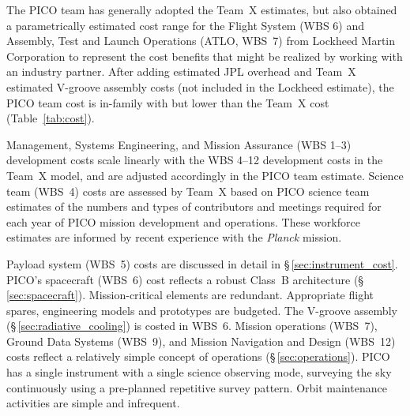 
The PICO team has generally adopted the Team~X estimates, but also
obtained a parametrically estimated cost range for the Flight System
(WBS 6) and Assembly, Test and Launch Operations (ATLO, WBS~7) from
Lockheed Martin Corporation to represent the cost benefits that might
be realized by working with an industry partner. After adding
estimated JPL overhead and Team~X estimated V-groove assembly costs
(not included in the Lockheed estimate), the PICO team cost is
in-family with but lower than the Team~X cost (Table~\ref{tab:cost}).

Management, Systems Engineering, and Mission Assurance (WBS 1--3)
development costs scale linearly with the WBS 4--12 development costs
in the Team~X model, and are adjusted accordingly in the PICO team
estimate. Science team (WBS~4) costs are assessed by Team~X based on PICO
science team estimates of the numbers and types of contributors and
meetings required for each year of PICO mission development and
operations. These workforce estimates are informed by recent
experience with the \textit{Planck} mission.

Payload system (WBS~5) costs are discussed in detail in
\S\,\ref{sec:instrument_cost}.  PICO's spacecraft (WBS~6) cost
reflects a robust Class~B architecture
(\S\,\ref{sec:spacecraft}). Mission-critical elements are
redundant. Appropriate flight spares, engineering models and
prototypes are budgeted. The V-groove assembly (\S\,\ref{sec:radiative_cooling})
is costed in WBS~6.  Mission operations (WBS~7), Ground Data Systems
(WBS~9), and Mission Navigation and Design (WBS~12) costs reflect a
relatively simple concept of operations (\S\,\ref{sec:operations}). PICO has a single
instrument with a single science observing mode, surveying the sky
continuously using a pre-planned repetitive survey pattern. Orbit
maintenance activities are simple and infrequent.

